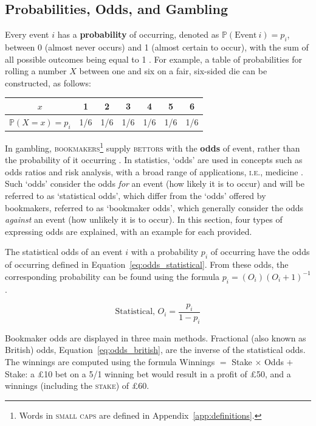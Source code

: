 \documentclass[a4paper,10pt]{report}
\begin{document}
\subsection{Probabilities, Odds, and Gambling} \label{sec:proboddsgambling}
Every event $i$ has a \textbf{probability} of occurring, denoted as $\mathbb{P}(\textrm{Event}\ i) = p_i$, between 0 (almost never occurs) and 1 (almost certain to occur), with the sum of all possible outcomes being equal to 1 \autocite{Grinstead12}. For example, a table of probabilities for rolling a number $X$ between one and six on a fair, six-sided die can be constructed, as follows:

\begin{center}\begin{tabular}{c|cccccc}
		$x$ 					& 1 & 2 & 3 & 4 & 5 & 6 \\\hline
		$\mathbb{P}(X=x)=p_i$	&1/6&1/6&1/6&1/6&1/6&1/6
\end{tabular}\end{center}

In gambling, \textsc{bookmakers}\footnote{Words in \textsc{small caps} are defined in Appendix~\ref{app:definitions}.} supply \textsc{bettors} with the \textbf{odds} of event, rather than the probability of it occurring \autocite{Strumbelj14}. In statistics, `odds' are used in concepts such as odds ratios and risk analysis, with a broad range of applications, \textsc{i.e.}, medicine \autocite{morris88}. Such `odds' consider the odds \textit{for} an event (how likely it is to occur) and will be referred to as `statistical odds', which differ from the `odds' offered by bookmakers, referred to as `bookmaker odds', which generally consider the odds \textit{against} an event (how unlikely it is to occur). In this section, four types of expressing odds are explained, with an example for each provided. \vspace{3mm}

The statistical odds of an event $i$ with a probability $p_i$ of occurring have the odds of occurring defined in Equation~\ref{eq:odds_statistical}. From these odds, the corresponding probability can be found using the formula $p_i = (O_i)(O_i+1)^{-1}$.

\begin{equation}
\textrm{Statistical, }O_i = \frac{p_i}{1-p_i}\label{eq:odds_statistical}
\end{equation}

Bookmaker odds are displayed in three main methods. Fractional (also known as British) odds, Equation~\ref{eq:odds_british}, are the inverse of the statistical odds. The winnings are computed using the formula Winnings $=$ Stake $\times$ Odds $+$ Stake: a £10 bet on a 5/1 winning bet would result in a profit of £50, and a winnings (including the \textsc{stake}) of £60.
\end{document}
